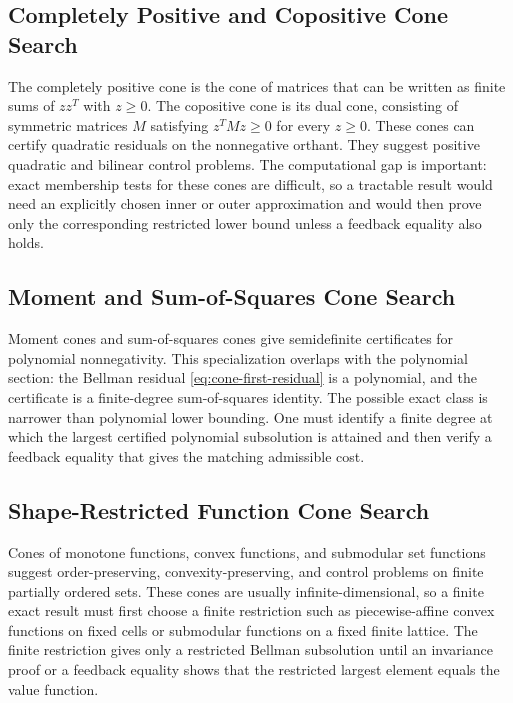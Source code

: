 \documentclass{article}
\begin{document}
\subsection{Completely Positive and Copositive Cone Search}

The completely positive cone is the cone of matrices that can be written as finite sums of $zz^T$ with $z\geq0$. The copositive cone is its dual cone, consisting of symmetric matrices $M$ satisfying $z^TMz\geq0$ for every $z\geq0$. These cones can certify quadratic residuals on the nonnegative orthant. They suggest positive quadratic and bilinear control problems. The computational gap is important: exact membership tests for these cones are difficult, so a tractable result would need an explicitly chosen inner or outer approximation and would then prove only the corresponding restricted lower bound unless a feedback equality also holds.

\subsection{Moment and Sum-of-Squares Cone Search}

Moment cones and sum-of-squares cones give semidefinite certificates for polynomial nonnegativity. This specialization overlaps with the polynomial section: the Bellman residual \eqref{eq:cone-first-residual} is a polynomial, and the certificate is a finite-degree sum-of-squares identity. The possible exact class is narrower than polynomial lower bounding. One must identify a finite degree at which the largest certified polynomial subsolution is attained and then verify a feedback equality that gives the matching admissible cost.

\subsection{Shape-Restricted Function Cone Search}

Cones of monotone functions, convex functions, and submodular set functions suggest order-preserving, convexity-preserving, and control problems on finite partially ordered sets. These cones are usually infinite-dimensional, so a finite exact result must first choose a finite restriction such as piecewise-affine convex functions on fixed cells or submodular functions on a fixed finite lattice. The finite restriction gives only a restricted Bellman subsolution until an invariance proof or a feedback equality shows that the restricted largest element equals the value function.
\end{document}
